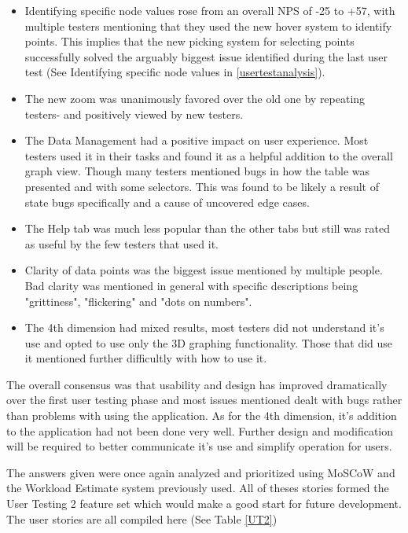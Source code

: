 \begin{itemize}
    \item Identifying specific node values rose from an overall NPS of -25 to +57, with multiple testers mentioning that they used the new hover system to identify points. This implies that the new picking system for selecting points successfully solved the arguably biggest issue identified during the last user test (See Identifying specific node values in \ref{usertestanalysis}).
    \item The new zoom was unanimously favored over the old one by repeating testers- and positively viewed by new testers.
    \item The Data Management had a positive impact on user experience. Most testers used it in their tasks and found it as a helpful addition to the overall graph view. Though many testers mentioned bugs in how the table was presented and with some selectors. This was found to be likely a result of state bugs specifically and a cause of uncovered edge cases.
    \item The Help tab was much less popular than the other tabs but still was rated as useful by the few testers that used it.
    \item Clarity of data points was the biggest issue mentioned by multiple people. Bad clarity was mentioned in general with specific descriptions being "grittiness", "flickering" and "dots on numbers".
    \item The 4th dimension had mixed results, most testers did not understand it's use and opted to use only the 3D graphing functionality. Those that did use it mentioned further difficultly with how to use it.
\end{itemize}

The overall consensus was that usability and design has improved dramatically over the first user testing phase and most issues mentioned dealt with bugs rather than problems with using the application. As for the 4th dimension, it's addition to the application had not been done very well. Further design and modification will be required to better communicate it's use and simplify operation for users.

The answers given were once again analyzed and prioritized using MoSCoW and the Workload Estimate system previously used. All of theses stories formed the User Testing 2 feature set which would make a good start for future development.
The user stories are all compiled here (See Table \ref{UT2})

